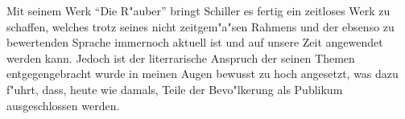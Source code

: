 Mit seinem Werk "`Die R"auber"' bringt Schiller es fertig ein zeitloses Werk zu schaffen, welches trotz seines nicht zeitgem"a"sen Rahmens und der ebsenso zu bewertenden Sprache immernoch aktuell ist und auf unsere Zeit angewendet werden kann. Jedoch ist der literrarische Anspruch der seinen Themen entgegengebracht wurde in meinen Augen bewusst zu hoch angesetzt, was dazu f"uhrt, dass,  heute wie damals, Teile der Bevo"lkerung als Publikum ausgeschlossen werden.